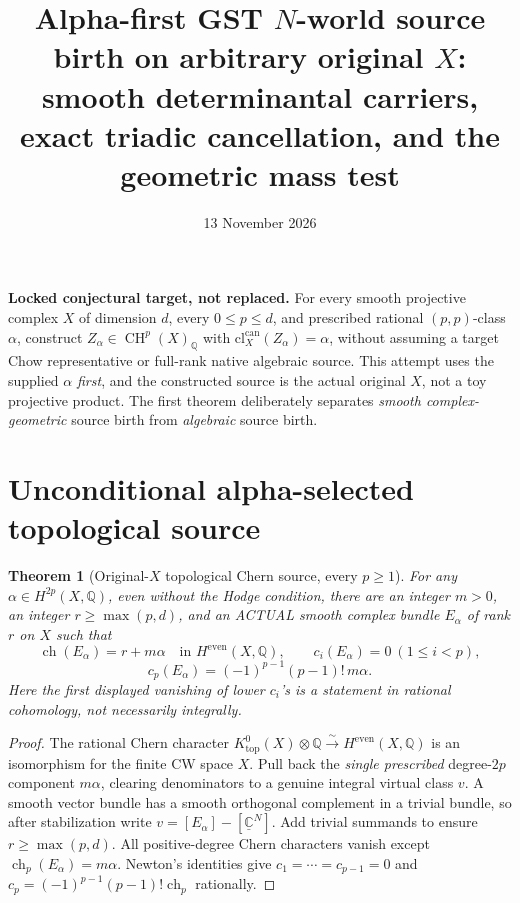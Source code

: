 \documentclass[11pt]{article}
\title{Alpha-first GST \(N\)-world source birth on arbitrary original \(X\): smooth determinantal carriers, exact triadic cancellation, and the geometric mass test}
\date{13 November 2026}
\newtheorem{theorem}{Theorem}[section]
\newcommand{\Q}{\mathbb Q}
\newcommand{\CH}{\operatorname{CH}}
\newcommand{\ch}{\operatorname{ch}}
\begin{document}
\maketitle

\noindent\textbf{Locked conjectural target, not replaced.} For every smooth projective complex \(X\) of dimension \(d\), every \(0\le p\le d\), and prescribed rational \((p,p)\)-class \(\alpha\), construct \(Z_\alpha\in\CH^p(X)_{\Q}\) with \(\mathrm{cl}^{\mathrm{can}}_X(Z_\alpha)=\alpha\), without assuming a target Chow representative or full-rank native algebraic source. This attempt uses the supplied \(\alpha\) \emph{first}, and the constructed source is the actual original \(X\), not a toy projective product. The first theorem deliberately separates \emph{smooth complex-geometric} source birth from \emph{algebraic} source birth.

\section{Unconditional alpha-selected topological source}
\begin{theorem}[Original-\(X\) topological Chern source, every \(p\ge1\)]
For any \(\alpha\in H^{2p}(X,\Q)\), even without the Hodge condition, there are an integer \(m>0\), an integer \(r\ge\max(p,d)\), and an ACTUAL smooth complex bundle \(E_\alpha\) of rank \(r\) on \(X\) such that
\[
\ch(E_\alpha)=r+m\alpha\quad\text{in }H^{\mathrm{even}}(X,\Q),\qquad
c_i(E_\alpha)=0\ (1\le i<p),
\]
\[
\boxed{c_p(E_\alpha)=(-1)^{p-1}(p-1)!\,m\alpha.}\tag{1}
\]
Here the first displayed vanishing of lower \(c_i\)'s is a statement in \emph{rational cohomology}, not necessarily integrally.
\end{theorem}
\begin{proof}
The rational Chern character \(K^0_{\mathrm{top}}(X)\otimes\Q\xrightarrow{\sim}H^{\mathrm{even}}(X,\Q)\) is an isomorphism for the finite CW space \(X\). Pull back the \emph{single prescribed} degree-\(2p\) component \(m\alpha\), clearing denominators to a genuine integral virtual class \(v\). A smooth vector bundle has a smooth orthogonal complement in a trivial bundle, so after stabilization write \(v=[E_\alpha]-[\underline{\mathbb C}^N]\). Add trivial summands to ensure \(r\ge\max(p,d)\). All positive-degree Chern characters vanish except \(\ch_p(E_\alpha)=m\alpha\). Newton's identities give \(c_1=\cdots=c_{p-1}=0\) and \(c_p=(-1)^{p-1}(p-1)!\ch_p\) rationally.
\end{proof}
\end{document}
